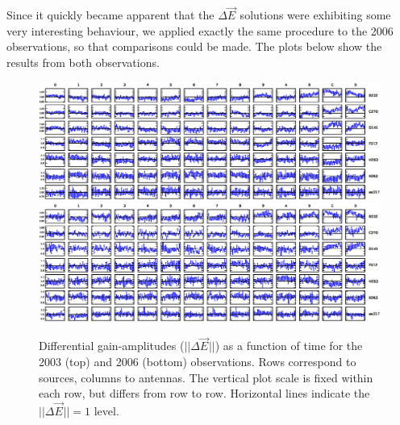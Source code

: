 \documentclass[]{aa}
\newcommand{\jones}[2]{\vec {#1}_{#2}}
\begin{document}
Since it quickly became apparent that the $\Delta\jones{E}{}$ solutions were exhibiting some very interesting behaviour, we applied exactly the same procedure to the 2006 observations, so that comparisons could be made. The plots below show the results from both observations. 

\begin{figure}
\sidecaption
\parbox[b]{12cm}{
\includegraphics[width=12cm]{o2003_dE_mean} \\
\includegraphics[width=12cm]{o2006_dE_mean}
}
\caption{\label{fig:dEampl}Differential gain-amplitudes ($||\Delta\jones{E}{}||$) as a function of time for the 2003 (top) and 2006 (bottom) observations. Rows correspond to sources, columns to antennas. The vertical plot scale is fixed within each row, but differs from row to row. Horizontal lines indicate the $||\Delta\jones{E}{}||=1$ level.}
\end{figure}
\end{document}
